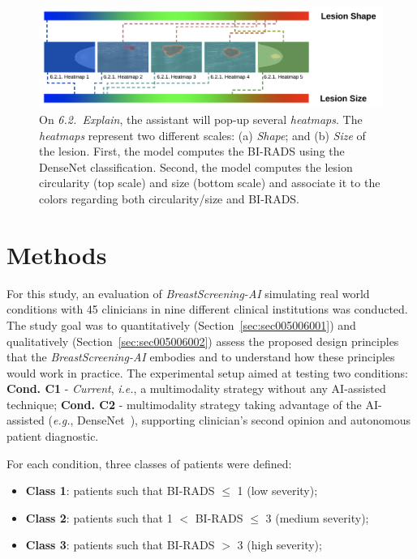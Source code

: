 \begin{figure}[htbp]
\centering
\includegraphics[width=\columnwidth]{images/fig032}
\caption{On {\it 6.2.~Explain}, the assistant will pop-up several {\it heatmaps}. The {\it heatmaps} represent two different scales: (a) {\it Shape}; and (b) {\it Size} of the lesion. First, the model computes the BI-RADS using the DenseNet classification. Second, the model computes the lesion circularity (top scale) and size (bottom scale) and associate it to the colors regarding both circularity/size and BI-RADS.}
\label{fig:fig032}
\end{figure}

\section{Methods}
\label{sec:sec005005}

For this study, an evaluation of {\it BreastScreening-AI} simulating real world conditions with 45 clinicians in nine different clinical institutions was conducted.
The study goal was to quantitatively (Section~\ref{sec:sec005006001}) and qualitatively (Section~\ref{sec:sec005006002}) assess the proposed design principles that the {\it BreastScreening-AI} embodies and to understand how these principles would work in practice.
The experimental setup aimed at testing two conditions: {\bf Cond. C1} - {\it Current}, {\it i.e.}, a multimodality strategy without any \ac{AI}-assisted technique; {\bf Cond. C2} - multimodality strategy taking advantage of the  \ac{AI}-assisted ({\it e.g.}, DenseNet~\cite{9098470}), supporting clinician's second opinion and autonomous patient diagnostic.

\hfill

\noindent
For each condition, three classes of patients were defined:

\begin{itemize}
\item {\bf Class 1}: patients such that \ac{BI-RADS} $\leq$ 1 (low severity);
\item {\bf Class 2}: patients such that 1 $<$ \ac{BI-RADS} $\leq$ 3 (medium severity);
\item {\bf Class 3}: patients such that \ac{BI-RADS} $>$ 3 (high severity);
\end{itemize}

